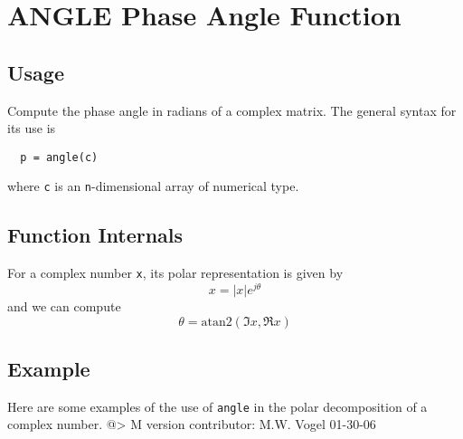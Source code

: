 \section{ANGLE Phase Angle Function
}

\subsection{Usage}

Compute the phase angle in radians of a complex matrix.  The general
syntax for its use is
\begin{verbatim}
  p = angle(c)
\end{verbatim}
where \verb|c| is an \verb|n|-dimensional array of numerical type.
\subsection{Function Internals}

For a complex number \verb|x|, its polar representation is
given by
\[
  x = |x| e^{j\theta}
\]
and we can compute 
\[
  \theta = \mathrm{atan2}(\Im x, \Re x)
\]
\subsection{Example}

Here are some examples of the use of \verb|angle| in the polar decomposition
of a complex number.
@>
   M version contributor: M.W. Vogel 01-30-06
